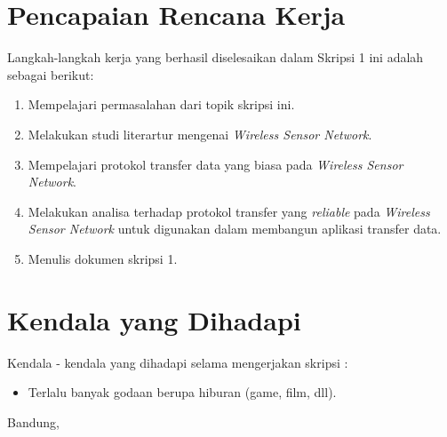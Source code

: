 \documentclass[a4paper,twoside]{article}
\begin{document}
\section{Pencapaian Rencana Kerja}
Langkah-langkah kerja yang berhasil diselesaikan dalam Skripsi 1 ini adalah sebagai berikut:
\begin{enumerate}
\item Mempelajari permasalahan dari topik skripsi ini.
\item Melakukan studi literartur mengenai \textit{Wireless Sensor Network}.
\item Mempelajari protokol transfer data yang biasa pada \textit{Wireless Sensor Network}.
\item Melakukan analisa terhadap protokol transfer yang \textit{reliable} pada \textit{Wireless Sensor Network} untuk digunakan dalam membangun aplikasi transfer data.
\item Menulis dokumen skripsi 1.
\end{enumerate}


\section{Kendala yang Dihadapi}
Kendala - kendala yang dihadapi selama mengerjakan skripsi :
\begin{itemize}
	\item Terlalu banyak godaan berupa hiburan (game, film, dll).
\end{itemize}

\vspace{1cm}
\centering Bandung, \tanggal\\
\vspace{2cm} \nama \\ 
\vspace{1cm}
\end{document}
